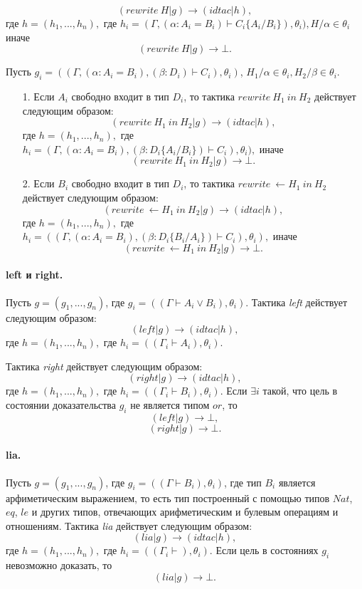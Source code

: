 \documentclass[12pt]{article}
\begin{document}
$$(rewrite\ H|g) \xrightarrow{} (idtac| h),$$
где $h=(h_1,...,h_n),$ где $h_i= (\Gamma, (\alpha: A_i = B_i) \vdash C_i\{A_i/B_i\}), \theta_i), H/\alpha \in \theta_i$ иначе
$$(rewrite\ H|g) \xrightarrow{} \bot.$$

Пусть $g_i = ((\Gamma, (\alpha: A_i = B_i),(\beta: D_i) \vdash C_i), \theta_i)$, $H_1/\alpha \in \theta_i, H_2/\beta \in \theta_i$.
\begin{enumerate}
    \item[1.] Если $A_i$ свободно входит в тип $D_i$, то тактика $rewrite\ H_1\ in\ H_2$ действует следующим образом:
    $$(rewrite\ H_1\ in\ H_2|g) \xrightarrow{} (idtac| h),$$
где $h=(h_1,...,h_n),$ где $h_i= (\Gamma, (\alpha: A_i = B_i), (\beta: D_i\{A_i/B_i\}) \vdash C_i), \theta_i),$ иначе
    $$(rewrite\ H_1\ in\ H_2|g) \xrightarrow{} \bot.$$
    \item[2.] Если $B_i$ свободно входит в тип $D_i$, то тактика $rewrite\ \xleftarrow{} H_1\ in\ H_2$ действует следующим образом:
    $$(rewrite\ \xleftarrow{} H_1\ in\ H_2|g) \xrightarrow{} (idtac| h),$$
    где $h=(h_1,...,h_n),$ где $h_i= ((\Gamma, (\alpha: A_i = B_i), (\beta: D_i\{B_i/A_i\}) \vdash C_i), \theta_i),$  
    иначе
    $$(rewrite\ \xleftarrow{} H_1\ in\ H_2|g) \xrightarrow{} \bot.$$
\end{enumerate}


\paragraph{left и right.}
Пусть $g = (g_1, ..., g_n)$, где $g_i = ((\Gamma \vdash A_i \vee B_i), \theta_i)$.
Тактика \textit{left} действует следующим образом:
$$(left|g) \xrightarrow{} (idtac| h),$$
где $h=(h_1, ...,h_n),$ где $h_i= ((\Gamma_i \vdash A_i), \theta_i)$.

Тактика \textit{right} действует следующим образом:
$$(right|g) \xrightarrow{} (idtac| h),$$
где $h=(h_1, ...,h_n),$ где $h_i= ((\Gamma_i \vdash B_i), \theta_i)$.
Если $\exists i$ такой, что цель в состоянии доказательства $g_i$ не является типом $or$, то
$$(left|g) \xrightarrow{} \bot,$$ 
$$(right|g) \xrightarrow{} \bot.$$ 


\paragraph{lia.}
Пусть $g = (g_1, ..., g_n)$, где $g_i = ((\Gamma \vdash B_i), \theta_i)$, где тип $B_i$ является арфиметическим выражением, то есть тип построенный с помощью типов $Nat$, $eq$, $le$ и других типов, отвечающих арифметическим и булевым операциям и отношениям.
Тактика \textit{lia} действует следующим образом:
$$(lia|g) \xrightarrow{} (idtac| h),$$
где $h=(h_1, ...,h_n),$ где $h_i= ((\Gamma_i \vdash), \theta_i)$. Если цель в состояниях $g_i$ невозможно доказать, то
$$(lia|g) \xrightarrow{} \bot.$$
\end{document}
